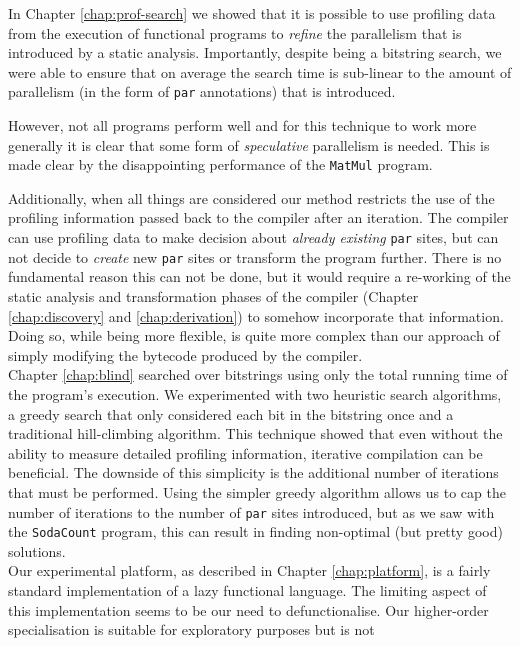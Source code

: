 In Chapter \ref{chap:prof-search} we showed that it is possible to use
profiling data from the execution of functional programs to \emph{refine} the
parallelism that is introduced by a static analysis. Importantly, despite being
a bitstring search, we were able to ensure that on average the search time is
sub-linear to the amount of parallelism (in the form of \verb|par| annotations)
that is introduced.

However, not all programs perform well and for this technique to work more
generally it is clear that some form of \emph{speculative} parallelism is
needed. This is made clear by the disappointing performance of the
\verb-MatMul- program.

Additionally, when all things are considered our method restricts the use of
the profiling information passed back to the compiler after an iteration. The
compiler can use profiling data to make decision about \emph{already existing}
\verb|par| sites, but can not decide to \emph{create} new \verb|par| sites or
transform the program further. There is no fundamental reason this can not be
done, but it would require a re-working of the static analysis and
transformation phases of the compiler (Chapter \ref{chap:discovery} and
\ref{chap:derivation}) to somehow incorporate that information. Doing so, while
being more flexible, is quite more complex than our approach of simply
modifying the bytecode produced by the compiler.
\\[0.35cm]
Chapter \ref{chap:blind} searched over bitstrings using only the total running
time of the program's execution. We experimented with two heuristic search
algorithms, a greedy search that only considered each bit in the bitstring once
and a traditional hill-climbing algorithm. This technique showed that even
without the ability to measure detailed profiling information, iterative
compilation can be beneficial. The downside of this simplicity is the
additional number of iterations that must be performed. Using the simpler
greedy algorithm allows us to cap the number of iterations to the number of
\verb|par| sites introduced, but as we saw with the \verb|SodaCount| program,
this can result in finding non-optimal (but pretty good) solutions.
\\[0.35cm]
Our experimental platform, as described in Chapter \ref{chap:platform}, is a
fairly standard implementation of a lazy functional language. The limiting
aspect of this implementation seems to be our need to defunctionalise. Our
higher-order specialisation is suitable for exploratory purposes but is not

